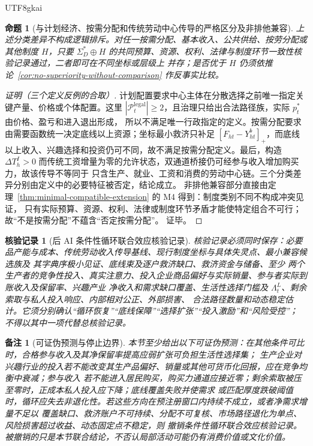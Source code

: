 \documentclass[12pt,a4paper,openany]{report}
\newtheorem{proposition}{命题}[chapter]
\newtheorem{remark}{备注}[chapter]
\newtheorem{Certificate}{核验记录}[chapter]
\begin{document}
\begin{CJK*}{UTF8}{gkai}
\begin{proposition}[与计划经济、按需分配和传统劳动中心传导的严格区分及非排他兼容]
上述分类差异不构成逻辑排斥。对任一按需分配、基本收入、公共供给、按劳分配或其他制度 \(H\)，只要
\(\Sigma_D^*\oplus H\) 的共同预算、资源、权利、法律与制度环节一致性核验记录通过，二者即可在不同坐标或层级上
并存；是否优于 \(H\) 仍须依推论~\ref{cor:no-superiority-without-comparison} 作反事实比较。
\end{proposition}

\begin{proof}[证明（三个定义反例的合取）]
计划配置要求中心主体在分散选择之前唯一指定关键产量、价格或个体配置。这里
\(|\mathcal P_t^{\mathrm{legal}}|\ge2\)，且治理只给出合法路径族，实际 \(p_t^*\) 由价格、盈亏和进入退出形成，
所以不满足唯一行政指定的定义。按需分配要求由需要函数统一决定底线以上资源；坐标最小救济只补足
\([F_{ht}-Y_{ht}^{b}]_+\)，而底线以上收入、兴趣选择和投资仍可不同，故不满足按需分配定义。最后，构造
\(\Delta T_h^I>0\) 而传统工资增量为零的允许状态，双通道桥接仍可经参与收入增加购买力，故该传导不等同于
只含生产、就业、工资和消费的劳动中心链。三个分类差异分别由定义中的必要特征被否定，结论成立。
非排他兼容部分直接由定理~\ref{thm:minimal-compatible-extension} 的 M4 得到：制度类别不同不构成冲突见证，
只有实际预算、资源、权利、法律或制度环节矛盾才能使特定组合不可行；故“不是按需分配”不蕴含“否定按需分配”。
证毕。
\end{proof}

\begin{Certificate}[后 AI 条件性循环联合效应核验记录]
核验记录必须同时保存：必要品产能与成本、传统劳动收入传导基线、现行制度坐标与具体失灵点、最小兼容候选族及
其字典序极小见证、底线束及逐户救济缺口、救济资金与储备、至少
两个生产者的竞争性投入、真实注意力、投入企业商品偏好与实际销量、参与者实际到账收入及保留率、兴趣产业
净收入和需求缺口覆盖、生活性选择门槛及 \(\Lambda_t^L\)、剩余索取与私人投入响应、内部相对公正、外部损害、
合法路径数量和动态稳定估计。它须分别确认“循环恢复”“底线保障”“选择扩张”“投入激励”和“风险受控”；
不得以其中一项代替总核验记录。
\end{Certificate}

\begin{remark}[可证伪预测与停止边界]
本节至少给出以下可证伪预测：在其他条件可比时，合格参与收入及其净保留率提高应弱扩张可负担生活性选择集；
生产企业对兴趣行业的投入若不能改变其生产品偏好、销量或其他可货币化回报，应在竞争均衡中衰减；参与收入
若不能进入居民购买，购买力通道应接近零；剩余索取被压至零时，正成本私人投入应下降；底线覆盖失败并使需求
或匹配厚度跌破阈值时，循环应失去非退化性。若这些方向在预注册窗口内持续不成立，或者净需求增量不足以
覆盖缺口、救济账户不可持续、分配不可复核、市场路径退化为单点、风险损害超过收益、动态固定点不稳定，则
撤销条件性循环联合效应核验记录。被撤销的只是本节联合结论，不否认局部活动可能仍有消费价值或文化价值。
\end{remark}


\end{CJK*}
\end{document}
